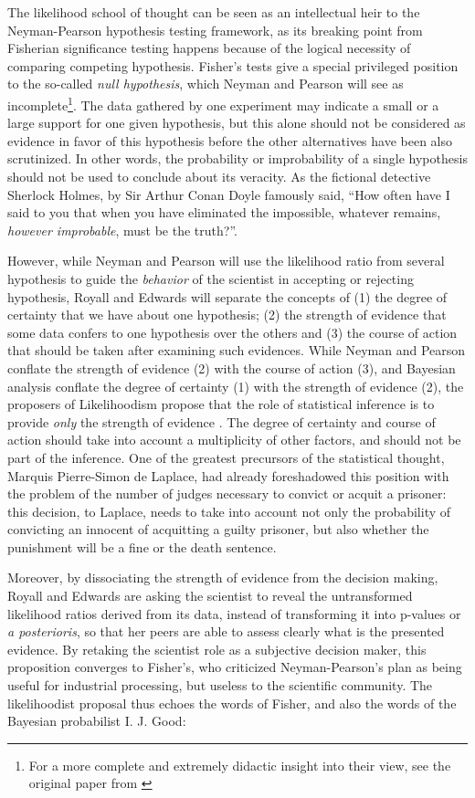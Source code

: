 \documentclass[twoside,12pt,a4paper]{article}
\begin{document}
The likelihood school of thought can be seen as an intellectual heir to the Neyman-Pearson hypothesis
testing framework, as its breaking point from Fisherian significance testing happens because of the
logical necessity of comparing competing hypothesis. Fisher's tests give a special privileged position
to the so-called {\em null hypothesis}, which Neyman and Pearson will see as incomplete\footnote{
For a more complete and extremely didactic insight into their view, see the original paper from 
\citep{Neyman1933}}. The data
gathered by one experiment may indicate a small or a large support for one given hypothesis, but this alone
should not be considered as evidence in favor of this hypothesis before the other alternatives have
been also scrutinized. In other words, the probability or improbability of a single hypothesis should not
be used to conclude about its veracity. As the fictional detective Sherlock Holmes, by Sir Arthur Conan
Doyle famously said, ``How often have I said to you that when you have eliminated the impossible, 
whatever remains, {\em however improbable}, must be the truth?''. 

However, while Neyman and Pearson will use the likelihood ratio from several hypothesis to guide the 
{\em behavior} of the scientist in accepting or rejecting hypothesis, Royall and Edwards will separate
the concepts of (1) the degree of certainty that we have about one hypothesis; (2) the strength of evidence
that some data confers to one hypothesis over the others and (3) the course of action that should be taken
after examining such evidences. While Neyman and Pearson conflate the strength of evidence (2) with the
course of action (3), and Bayesian analysis conflate the degree of certainty (1) with the strength of 
evidence (2), the proposers of Likelihoodism propose that the role of statistical inference is to provide
{\em only} the strength of evidence \citep{Royall97}. 
The degree of certainty and course of action should take into account
a multiplicity of other factors, and should not be part of the inference. One of the greatest precursors 
of the statistical thought, Marquis Pierre-Simon de Laplace, had already foreshadowed this position with
the problem of the number of judges necessary to convict or acquit a prisoner: this decision, to Laplace,
needs to take into account not only the probability of convicting an innocent of acquitting a guilty 
prisoner, but also whether the punishment will be a fine or the death sentence\citep{Laplace1814}.

Moreover, by dissociating the strength of evidence from the decision making, Royall and Edwards are asking
the scientist to reveal the untransformed likelihood ratios derived from its data, instead of transforming
it into p-values or {\em a posterioris}, so that her peers are able to assess clearly what is the presented
evidence. By retaking the scientist role as a subjective decision maker, this proposition converges to
Fisher's, who criticized Neyman-Pearson's plan as being useful for industrial processing, but useless
to the scientific community. The likelihoodist proposal thus echoes the words of Fisher, and also the words
of the Bayesian probabilist I. J. Good:
\end{document}
